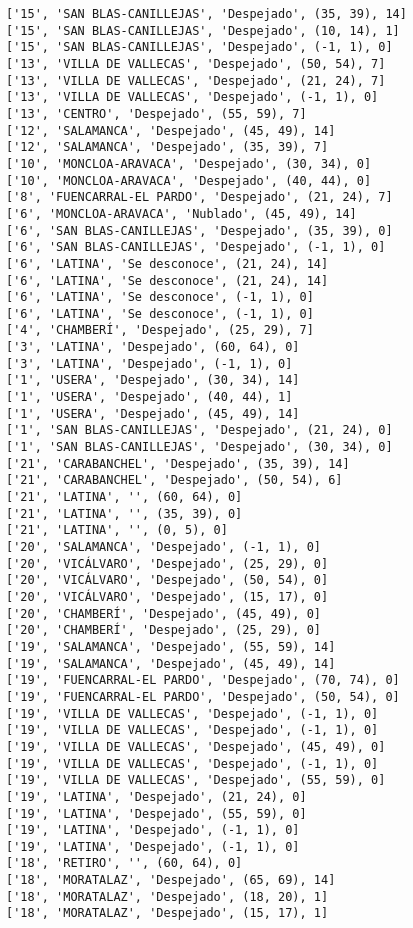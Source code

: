 \documentclass[11pt]{article}
\begin{document}
\begin{Verbatim}[commandchars=\\\{\}]
['15', 'SAN BLAS-CANILLEJAS', 'Despejado', (35, 39), 14]
['15', 'SAN BLAS-CANILLEJAS', 'Despejado', (10, 14), 1]
['15', 'SAN BLAS-CANILLEJAS', 'Despejado', (-1, 1), 0]
['13', 'VILLA DE VALLECAS', 'Despejado', (50, 54), 7]
['13', 'VILLA DE VALLECAS', 'Despejado', (21, 24), 7]
['13', 'VILLA DE VALLECAS', 'Despejado', (-1, 1), 0]
['13', 'CENTRO', 'Despejado', (55, 59), 7]
['12', 'SALAMANCA', 'Despejado', (45, 49), 14]
['12', 'SALAMANCA', 'Despejado', (35, 39), 7]
['10', 'MONCLOA-ARAVACA', 'Despejado', (30, 34), 0]
['10', 'MONCLOA-ARAVACA', 'Despejado', (40, 44), 0]
['8', 'FUENCARRAL-EL PARDO', 'Despejado', (21, 24), 7]
['6', 'MONCLOA-ARAVACA', 'Nublado', (45, 49), 14]
['6', 'SAN BLAS-CANILLEJAS', 'Despejado', (35, 39), 0]
['6', 'SAN BLAS-CANILLEJAS', 'Despejado', (-1, 1), 0]
['6', 'LATINA', 'Se desconoce', (21, 24), 14]
['6', 'LATINA', 'Se desconoce', (21, 24), 14]
['6', 'LATINA', 'Se desconoce', (-1, 1), 0]
['6', 'LATINA', 'Se desconoce', (-1, 1), 0]
['4', 'CHAMBERÍ', 'Despejado', (25, 29), 7]
['3', 'LATINA', 'Despejado', (60, 64), 0]
['3', 'LATINA', 'Despejado', (-1, 1), 0]
['1', 'USERA', 'Despejado', (30, 34), 14]
['1', 'USERA', 'Despejado', (40, 44), 1]
['1', 'USERA', 'Despejado', (45, 49), 14]
['1', 'SAN BLAS-CANILLEJAS', 'Despejado', (21, 24), 0]
['1', 'SAN BLAS-CANILLEJAS', 'Despejado', (30, 34), 0]
['21', 'CARABANCHEL', 'Despejado', (35, 39), 14]
['21', 'CARABANCHEL', 'Despejado', (50, 54), 6]
['21', 'LATINA', '', (60, 64), 0]
['21', 'LATINA', '', (35, 39), 0]
['21', 'LATINA', '', (0, 5), 0]
['20', 'SALAMANCA', 'Despejado', (-1, 1), 0]
['20', 'VICÁLVARO', 'Despejado', (25, 29), 0]
['20', 'VICÁLVARO', 'Despejado', (50, 54), 0]
['20', 'VICÁLVARO', 'Despejado', (15, 17), 0]
['20', 'CHAMBERÍ', 'Despejado', (45, 49), 0]
['20', 'CHAMBERÍ', 'Despejado', (25, 29), 0]
['19', 'SALAMANCA', 'Despejado', (55, 59), 14]
['19', 'SALAMANCA', 'Despejado', (45, 49), 14]
['19', 'FUENCARRAL-EL PARDO', 'Despejado', (70, 74), 0]
['19', 'FUENCARRAL-EL PARDO', 'Despejado', (50, 54), 0]
['19', 'VILLA DE VALLECAS', 'Despejado', (-1, 1), 0]
['19', 'VILLA DE VALLECAS', 'Despejado', (-1, 1), 0]
['19', 'VILLA DE VALLECAS', 'Despejado', (45, 49), 0]
['19', 'VILLA DE VALLECAS', 'Despejado', (-1, 1), 0]
['19', 'VILLA DE VALLECAS', 'Despejado', (55, 59), 0]
['19', 'LATINA', 'Despejado', (21, 24), 0]
['19', 'LATINA', 'Despejado', (55, 59), 0]
['19', 'LATINA', 'Despejado', (-1, 1), 0]
['19', 'LATINA', 'Despejado', (-1, 1), 0]
['18', 'RETIRO', '', (60, 64), 0]
['18', 'MORATALAZ', 'Despejado', (65, 69), 14]
['18', 'MORATALAZ', 'Despejado', (18, 20), 1]
['18', 'MORATALAZ', 'Despejado', (15, 17), 1]

\end{Verbatim}
\end{document}
